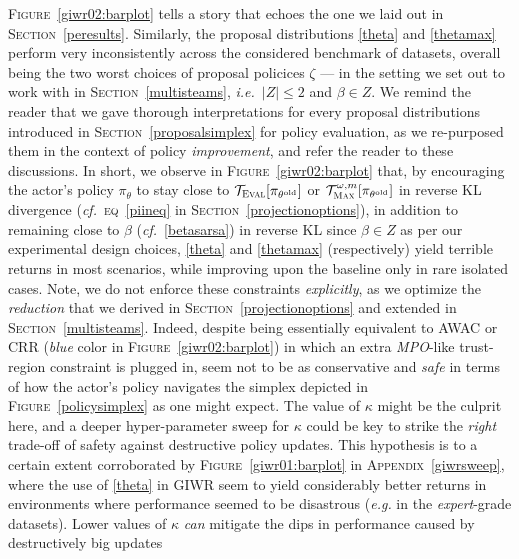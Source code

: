 \textsc{Figure}~\ref{giwr02:barplot} tells a story that echoes the one we laid out in \textsc{Section}~\ref{peresults}.
Similarly, the proposal distributions \ref{theta} and \ref{thetamax} perform very inconsistently across the
considered benchmark of datasets, overall being the two worst choices of proposal policices $\zeta$
--- in the setting we set out to work with in \textsc{Section}~\ref{multisteams},
\textit{i.e.}~$|Z| \leq 2$ and $\beta \in Z$.
We remind the reader that we gave thorough interpretations for every proposal distributions introduced
in \textsc{Section}~\ref{proposalsimplex} for policy evaluation,
as we re-purposed them in the context of policy \emph{improvement},
and refer the reader to these discussions.
In short, we observe in \textsc{Figure}~\ref{giwr02:barplot} that,
by encouraging the actor's policy $\pi_\theta$
to stay close to $\mathcal{T}_\textsc{Eval}[\pi_{\theta^\text{old}}]$ or
$\mathcal{T}_\textsc{Max}^{\omega, m}[\pi_{\theta^\text{old}}]$ in reverse KL divergence
(\textit{cf.}~\textsc{eq}~\ref{piineq} in \textsc{Section}~\ref{projectionoptions}),
in addition to remaining close to $\beta$ (\textit{cf.}~\ref{betasarsa}) in reverse KL since $\beta \in Z$
as per our experimental design choices, \ref{theta} and \ref{thetamax} (respectively)
yield terrible returns in most scenarios, while improving upon the baseline only in
rare isolated cases.
Note, we do not enforce these constraints \emph{explicitly}, as we optimize the \emph{reduction} that we derived
in \textsc{Section}~\ref{projectionoptions} and extended in \textsc{Section}~\ref{multisteams}.
Indeed, despite being essentially equivalent to AWAC \cite{Nair2020-gd} or CRR \cite{Wang2020-sr}
(\textit{blue} color in \textsc{Figure}~\ref{giwr02:barplot})
in which an extra \textit{MPO}-like trust-region constraint \cite{Abdolmaleki2018-sp} is plugged in,
seem not to be as conservative and \textit{safe} in terms of how the actor's policy navigates the simplex
depicted in \textsc{Figure}~\ref{policysimplex}
as one might expect.
The value of $\kappa$ might be the culprit here, and a deeper hyper-parameter sweep for $\kappa$ could be key
to strike the \textit{right} trade-off of safety against destructive policy updates.
This hypothesis is to a certain extent corroborated by \textsc{Figure}~\ref{giwr01:barplot}
in \textsc{Appendix}~\ref{giwrsweep}, where the use of \ref{theta} in GIWR
seem to yield considerably better returns in environments where performance seemed to be disastrous
(\textit{e.g.} in the \textit{expert}-grade datasets).
Lower values of $\kappa$ \emph{can} mitigate the dips in performance caused by destructively big updates
